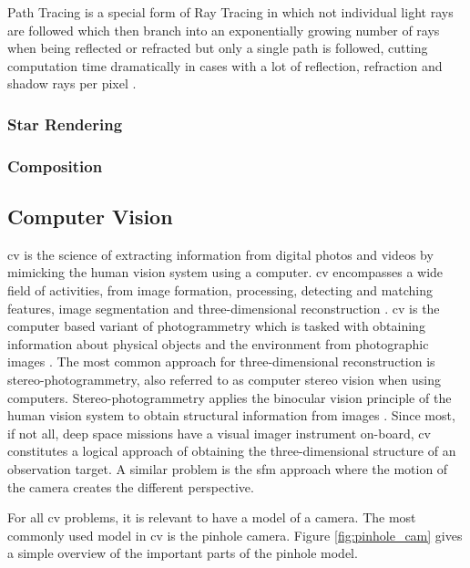 Path Tracing is a special form of Ray Tracing in which not individual light rays are followed which then branch into an exponentially growing number of rays when being reflected or refracted but only a single path is followed, cutting computation time dramatically in cases with a lot of reflection, refraction and shadow rays per pixel \cite{kajiya1986rendering}.

\subsubsection{Star Rendering}


\subsubsection{Composition}


\subsection{Computer Vision}
\Gls{cv} is the science of extracting information from digital photos and videos by mimicking the human vision system using a computer. \Gls{cv} encompasses a wide field of activities, from image formation, processing, detecting and matching features, image segmentation and three-dimensional reconstruction \cite{szeliski2010computer}. \Gls{cv} is the computer based variant of photogrammetry which is tasked with obtaining information about physical objects and the environment from photographic images \cite{linder2009digital}. The most common approach for three-dimensional reconstruction is stereo-photogrammetry, also referred to as computer stereo vision when using computers. Stereo-photogrammetry applies the binocular vision principle of the human vision system to obtain structural information from images \cite{do2019review}. Since most, if not all, deep space missions have a visual imager instrument on-board, \gls{cv} constitutes a logical approach of obtaining the three-dimensional structure of an observation target. A similar problem is the \gls{sfm} approach where the motion of the camera creates the different perspective.

For all \gls{cv} problems, it is relevant to have a model of a camera. The most commonly used model in \gls{cv} is the pinhole camera. Figure \ref{fig:pinhole_cam} gives a simple overview of the important parts of the pinhole model.

